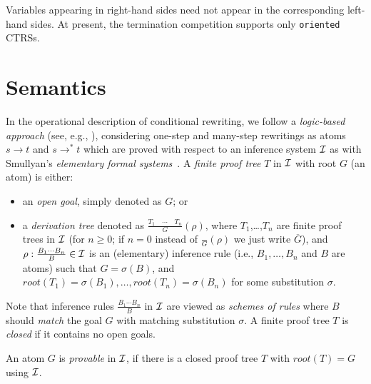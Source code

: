 Variables appearing in right-hand sides need not appear in the corresponding left-hand sides. At present, the termination competition supports only \texttt{oriented} CTRSs.

\section{Semantics}

In the operational description of conditional rewriting, we follow a \emph{logic-based approach} (see, e.g., \cite{plaisted1988LogicConditionalTerm,meseguer1992ConditionalRewritingLogic}), considering one-step and many-step rewritings as atoms $s\to t$ and $s\to^* t$ which are proved with respect to an inference system ${\cal I}$ as with Smullyan's \emph{elementary formal systems}~\cite{smullyan1961TheoryFormalSystems}.
%
A \emph{finite proof tree} $T$ in  ${\cal I}$
with root $G$ (an atom) is either:
\begin{itemize}
\item 
an \emph{open goal}, simply denoted as $G$; 
or
\item 
a \emph{derivation tree} %
denoted as
$
\frac{T_1 \quad \cdots \quad T_n}{G}(\rho)
$,
where %
$T_1$,\ldots,$T_n$ are finite proof trees in ${\cal I}$ (for $n\geq 0$; if $n=0$ instead of 
$\frac{}{G}(\rho)$
we just write
$\overline{G}$), and 
$\rho : \frac{B_{1} \cdots  B_{n}}{B}\in{\cal I}$ is an (elementary) inference rule
(i.e., $B_1,\ldots,B_n$ and $B$ are atoms) 
such that
$G = \sigma(B)$, and
$root(T_1)=\sigma(B_{1}), \ldots, root(T_n)=\sigma(B_{n})$
for some substitution $\sigma$. %
\end{itemize}
%
Note %
that 
inference rules $\frac{B_{1} \cdots  B_{n}}{B}$
in ${\cal I}$ are viewed
as \emph{schemes of rules} where $B$ should \emph{match} the goal $G$
with matching substitution $\sigma$.
%
A finite proof tree $T$ is \emph{closed} if it %
contains no open goals.
%
\begin{definition}\label{DefProbableGoal}
An atom $G$ is \emph{provable} in ${\cal I}$, %
if there is a closed proof tree $T$ with $root(T)=G$ using ${\cal I}$.
\end{definition}


